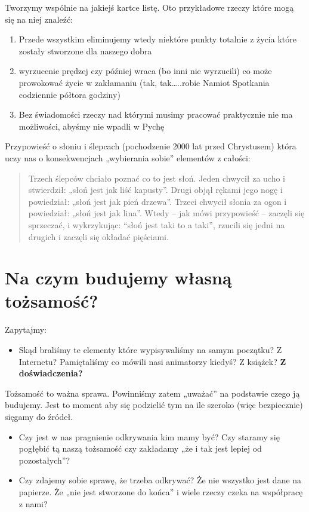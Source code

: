 \documentclass[a5paper,10pt,polish]{book}
\begin{document}
Tworzymy wspólnie na jakiejś kartce listę. Oto przykładowe rzeczy które mogą się na niej znaleźć:
\begin{enumerate}
\item {} 
Przede wszystkim eliminujemy wtedy niektóre punkty totalnie z życia które zostały stworzone dla naszego dobra

\item {} 
wyrzucenie prędzej czy później wraca (bo inni nie wyrzucili) co może prowokować życie w zakłamaniu (tak, tak…..robie Namiot Spotkania codziennie półtora godziny)

\item {} 
Bez świadomości rzeczy nad którymi musimy pracować praktycznie nie ma możliwości, abyśmy nie wpadli w Pychę

\end{enumerate}

Przypowieść o słoniu i ślepcach (pochodzenie 2000 lat przed Chrystusem) która uczy nas o konsekwencjach „wybierania sobie” elementów z całości:
\begin{quote}

Trzech ślepców chciało poznać co to jest słoń. Jeden chwycił za ucho i stwierdził: „słoń jest jak liść kapusty”. Drugi objął rękami jego nogę i powiedział: „słoń jest jak pień drzewa”. Trzeci chwycił słonia za ogon i powiedział: „słoń jest jak lina”. Wtedy – jak mówi przypowieść – zaczęli się sprzeczać, i wykrzykując: “słoń jest taki to a taki”, rzucili się jedni na drugich i zaczęli się okładać pięściami.
\end{quote}


\section{Na czym budujemy własną tożsamość?}
\label{babice2006-jesien-gliwice/spotkanie2:na-czym-budujemy-wlasna-tozsamosc}
Zapytajmy:
\begin{itemize}
\item {} 
Skąd braliśmy te elementy które wypisywaliśmy na samym początku? Z Internetu? Pamiętaliśmy co mówili nasi animatorzy kiedyś? Z książek? \textbf{Z doświadczenia?}

\end{itemize}

Tożsamość to ważna sprawa. Powinniśmy zatem „uważać” na podstawie czego ją budujemy. Jest to moment aby się podzielić tym na ile szeroko (więc bezpiecznie) sięgamy do źródeł.
\begin{itemize}
\item {} 
Czy jest w nas pragnienie odkrywania kim mamy być? Czy staramy się pogłębić tą naszą tożsamość czy zakładamy „że i tak jest lepiej od pozostałych”?

\item {} 
Czy zdajemy sobie sprawę, że trzeba odkrywać? Że nie wszystko jest dane na papierze. Że „nie jest stworzone do końca” i wiele rzeczy czeka na współpracę z nami?

\end{itemize}
\end{document}
